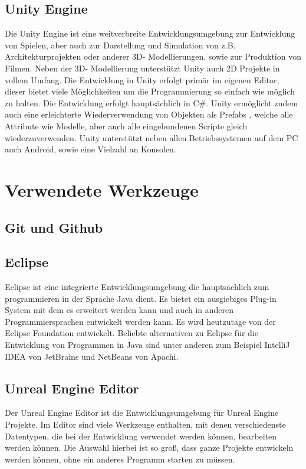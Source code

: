 \documentclass[
	12pt, %
	a4paper,
	listof=totoc, %
	bibliography=totoc, %
	numbers=noenddot, %
	ngerman, %
	headsepline, %
	oneside %
	]{scrbook} %
\begin{document}
\section{Unity Engine}
Die Unity Engine ist eine weitverbreite Entwicklungsumgebung zur Entwicklung von Spielen, aber auch zur Darstellung und Simulation von z.B. Architekturprojekten oder anderer 3D- Modellierungen, sowie zur Produktion von Filmen. Neben der 3D- Modellierung unterstützt Unity auch 2D Projekte in vollem Umfang. Die Entwicklung in Unity erfolgt primär im eigenen Editor, dieser bietet viele Möglichkeiten um die Programmierung so einfach wie möglich zu halten. Die Entwicklung erfolgt hauptsächlich in C#. Unity ermöglicht zudem auch eine erleichterte Wiederverwendung von Objekten als \qlqq Prefabs \qlqq, welche alle Attribute wie Modelle, aber auch alle eingebundenen Scripte gleich wiederzuverwenden. Unity unterstützt neben allen Betriebssystemen auf dem PC auch Android, sowie eine Vielzahl an Konsolen. 

\chapter{Verwendete Werkzeuge}
\section{Git und Github}
\section{Eclipse}
Eclipse ist eine integrierte Entwicklungsumgebung die hauptsächlich zum programmieren in der Sprache Java dient. Es bietet ein ausgiebiges Plug-in System mit dem es erweitert werden kann und auch in anderen Programmiersprachen entwickelt werden kann.
Es wird heutzutage von der Eclipse Foundation entwickelt. Beliebte alternativen zu Eclipse für die Entwicklung von Programmen in Java sind unter anderen zum Beispiel IntelliJ IDEA von JetBrains und NetBeans von Apachi.

\section{Unreal Engine Editor}

Der Unreal Engine Editor ist die Entwicklungsumgebung für Unreal Engine Projekte. Im Editor sind viele Werkzeuge enthalten, mit denen verschiedenste Datentypen, die bei der Entwicklung verwendet werden können, bearbeiten werden können. 
Die Auswahl hierbei ist so groß, dass ganze Projekte entwickeln werden können, ohne ein anderes Programm starten zu müssen.
\end{document}
